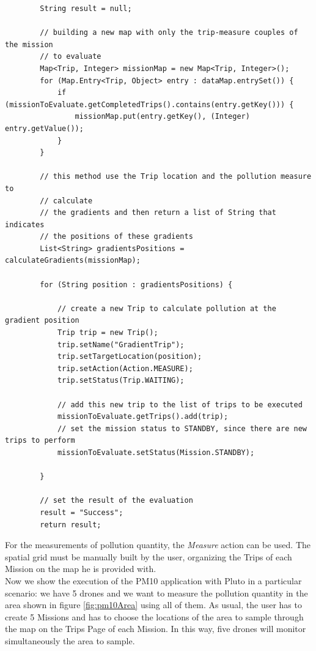 \begin{lstlisting}
		String result = null;

		// building a new map with only the trip-measure couples of the mission
		// to evaluate
		Map<Trip, Integer> missionMap = new Map<Trip, Integer>();
		for (Map.Entry<Trip, Object> entry : dataMap.entrySet()) {
			if (missionToEvaluate.getCompletedTrips().contains(entry.getKey())) {
				missionMap.put(entry.getKey(), (Integer) entry.getValue());
			}
		}

		// this method use the Trip location and the pollution measure to
		// calculate
		// the gradients and then return a list of String that indicates
		// the positions of these gradients
		List<String> gradientsPositions = calculateGradients(missionMap);

		for (String position : gradientsPositions) {

			// create a new Trip to calculate pollution at the gradient position
			Trip trip = new Trip();
			trip.setName("GradientTrip");
			trip.setTargetLocation(position);
			trip.setAction(Action.MEASURE);
			trip.setStatus(Trip.WAITING);

			// add this new trip to the list of trips to be executed
			missionToEvaluate.getTrips().add(trip);
			// set the mission status to STANDBY, since there are new trips to perform
			missionToEvaluate.setStatus(Mission.STANDBY);
			
		}
			
		// set the result of the evaluation
		result = "Success";
		return result;
\end{lstlisting}

For the measurements of pollution quantity, the \textit{Measure} action can be used.
The spatial grid must be manually built by the user, organizing the Trips of each Mission on the map he is provided with.
\\

Now we show the execution of the PM10 application with Pluto in a particular scenario:
we have 5 drones and we want to measure the pollution quantity in the area shown in figure \ref{fig:pm10Area} using all of them.
As usual, the user has to create 5 Missions and has to choose the locations of the area to sample through the map on the Trips Page of each Mission.
In this way, five drones will monitor simultaneously the area to sample.

